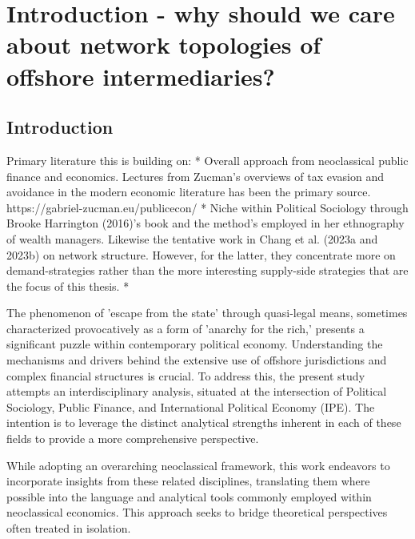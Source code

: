 \chapter{Introduction - why should we care about network topologies of offshore intermediaries?}
\label{chap:introduction}

\section{Introduction} %
\label{sec:1_0}


Primary literature this is building on:
* Overall approach from neoclassical public finance and economics. Lectures from Zucman's overviews of tax evasion and avoidance in the modern economic literature has been the primary source. https://gabriel-zucman.eu/publicecon/
* Niche within Political Sociology through Brooke Harrington (2016)'s book and the method's employed in her ethnography of wealth managers. Likewise the tentative work in Chang et al. (2023a and 2023b) on network structure. However, for the latter, they concentrate more on demand-strategies rather than the more interesting supply-side strategies that are the focus of this thesis.
* 

The phenomenon of 'escape from the state' through quasi-legal means, sometimes characterized provocatively as a form of 'anarchy for the rich,' presents a significant puzzle within contemporary political economy. Understanding the mechanisms and drivers behind the extensive use of offshore jurisdictions and complex financial structures is crucial. To address this, the present study attempts an interdisciplinary analysis, situated at the intersection of Political Sociology, Public Finance, and International Political Economy (IPE). The intention is to leverage the distinct analytical strengths inherent in each of these fields to provide a more comprehensive perspective.

While adopting an overarching neoclassical framework, this work endeavors to incorporate insights from these related disciplines, translating them where possible into the language and analytical tools commonly employed within neoclassical economics. This approach seeks to bridge theoretical perspectives often treated in isolation.

